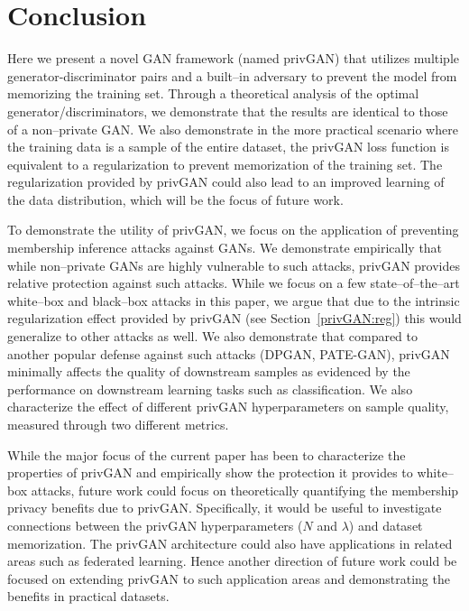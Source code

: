 \documentclass{article}
\begin{document}
\section{Conclusion}
Here we present a novel GAN framework (named privGAN) that utilizes multiple generator-discriminator pairs and a built--in adversary to prevent the model from memorizing the training set. Through a theoretical analysis of the optimal generator/discriminators, we demonstrate that the results are identical to those of a non--private GAN. We also demonstrate in the more practical scenario where the training data is a sample of the entire dataset, the privGAN loss function is equivalent to a regularization to prevent memorization of the training set. The regularization provided by privGAN could also lead to an improved learning of the data distribution, which will be the focus of future work.

To demonstrate the utility of privGAN, we focus on the application of preventing membership inference attacks against GANs. We demonstrate empirically that while non--private GANs are highly vulnerable to such attacks, privGAN provides relative protection against such attacks. While we focus on a few state--of--the--art white--box and black--box attacks in this paper, we argue that due to the intrinsic regularization effect provided by privGAN (see Section~\ref{privGAN:reg}) this would generalize to other attacks as well. We also demonstrate that compared to another popular defense against such attacks (DPGAN, PATE-GAN), privGAN minimally affects the quality of downstream samples as evidenced by the performance on downstream learning tasks such as classification. We also characterize the effect of different privGAN hyperparameters on sample quality, measured through two different metrics. 

While the major focus of the current paper has been to characterize the properties of privGAN and empirically show the protection it provides to white--box attacks, future work could focus on theoretically quantifying the membership privacy benefits due to privGAN. Specifically, it would be useful to investigate connections between the privGAN hyperparameters ($N$ and $\lambda$) and dataset memorization. The privGAN architecture could also have applications in related areas such as federated learning. Hence another direction of future work could be focused on extending privGAN to such application areas and demonstrating the benefits in practical datasets. 




\end{document}
